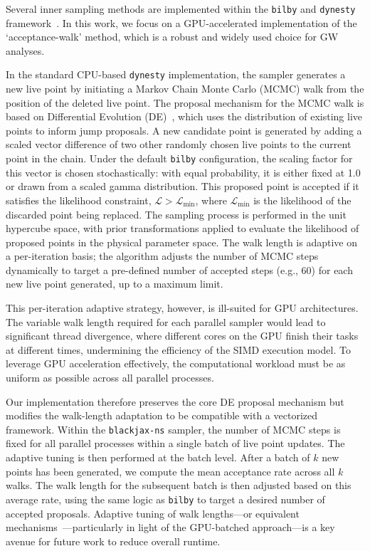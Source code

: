 \documentclass[fleqn,usenatbib]{mnras}
\begin{document}
Several inner sampling methods are implemented within the
\texttt{bilby} and \texttt{dynesty} framework~\citep{bilby_paper, dynesty}. In this work, we
focus on a GPU-accelerated implementation of the `acceptance-walk'
method, which is a robust and widely used choice for GW analyses.

In the standard CPU-based \texttt{dynesty} implementation, the sampler
generates a new live point by initiating a Markov Chain Monte Carlo
(MCMC) walk from the position of the deleted live point. 
The proposal mechanism for the MCMC walk is based on Differential
Evolution (DE)~\citep{DE, DE2}, which uses the distribution of existing live points to
inform jump proposals. A new candidate point is generated by adding a
scaled vector difference of two other randomly chosen live points to the
current point in the chain. Under the default \texttt{bilby} configuration, 
the scaling factor for this vector is chosen stochastically: with equal probability, 
it is either fixed at 1.0 or drawn from a scaled gamma distribution. This proposed 
point is accepted if it satisfies the likelihood constraint, $\mathcal{L} > \mathcal{L}_{\text{min}}$,
where $\mathcal{L}_{\text{min}}$ is the likelihood of the
discarded point being replaced. The sampling
process is performed in the unit hypercube space, with prior
transformations applied to evaluate the likelihood of proposed points in the physical parameter space. 
The walk length is adaptive on a per-iteration
basis; the algorithm adjusts the number of MCMC steps dynamically to
target a pre-defined number of accepted steps (e.g., 60) for each new
live point generated, up to a maximum limit.

This per-iteration adaptive strategy, however, is ill-suited for GPU
architectures. The variable walk length required for each parallel
sampler would lead to significant thread divergence, where different
cores on the GPU finish their tasks at different times, undermining the
efficiency of the SIMD execution model. To leverage GPU acceleration
effectively, the computational workload must be as uniform as possible
across all parallel processes.

Our implementation therefore preserves the core DE proposal mechanism but
modifies the walk-length adaptation to be compatible with a vectorized
framework. Within the \texttt{blackjax-ns} sampler, the number of MCMC
steps is fixed for all parallel processes within a single batch of
live point updates. The adaptive tuning is then performed at the batch
level. After a batch of $k$ new points has been generated, we compute
the mean acceptance rate across all $k$ walks. The walk length for the
subsequent batch is then adjusted based on this average rate,
using the same logic as \texttt{bilby} to target a desired number of
accepted proposals. Adaptive tuning of walk lengths—or equivalent mechanisms~\citep{dau2021wastefreesequentialmontecarlo}—particularly in light of the GPU-batched approach—is a key avenue for future work to reduce overall runtime.
\end{document}
